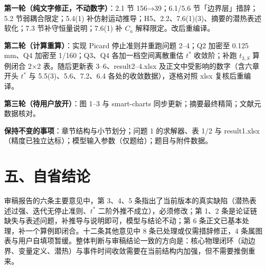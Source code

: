 \documentclass[12pt,a4paper]{ctexart}
\begin{document}
\textbf{第一轮（纯文字修正，不动数字）}：2.1 节 156→39；6.1/5.6 节「边界层」措辞；5.2 节弱耦合限定；5.4(1) 补仿射运动推导；H5、2.2、7.6(1)(3)、摘要的潜热表述软化；7.3 节补守恒量说明；7.6(1) 补 $C_a$ 解释限定。改后重编译。

\textbf{第二轮（计算重算）}：实现 Picard 停止准则并重跑问题 2--4；Q2 加密至 0.125 mm、Q4 加密至 1/160；Q3、Q4 各加一档空间离散重估 $t^*$ 收敛阶；补跑 $t_{3,S}$ 算例闭合 2×2 表。随后更新表 3--6、result2--4.xlsx 及正文中受影响的数字（含六章开头 $t^*$ 与 5.5(3)、5.6、7.2、6.4 各处的收敛数据），逐格对照 xlsx 复核后重编译。

\textbf{第三轮（待用户放开）}：图 1--3 与 smart-charts 同步更新；摘要最终精简；文献元数据核对。

\textbf{保持不变的事项}：章节结构与小节划分；问题 1 的求解器、表 1/2 与 result1.xlsx（精度已独立达标）；模型输入参数（仅题给）；题目与附件数据。

\section{五、自省结论}

审稿报告的六条主要意见中，第 3、4、5 条指出了当前版本的真实缺陷（潜热表述过强、迭代无停止准则、$t^*$ 二阶外推不成立），必须修改；第 1、2 条是论证链缺失与表述问题，补推导与说明即可，模型与结论不动；第 6 条正文已基本处理，补一个算例即闭合。十二条其他意见中 8 条已处理或仅需措辞修正，4 条属图表与用户自填项暂缓。整体判断与审稿结论一致的方向是：核心物理闭环（动边界、变量定义、潜热）与事件时间收敛需要在当前结构内加强，但不需要推倒重来。
\end{document}
